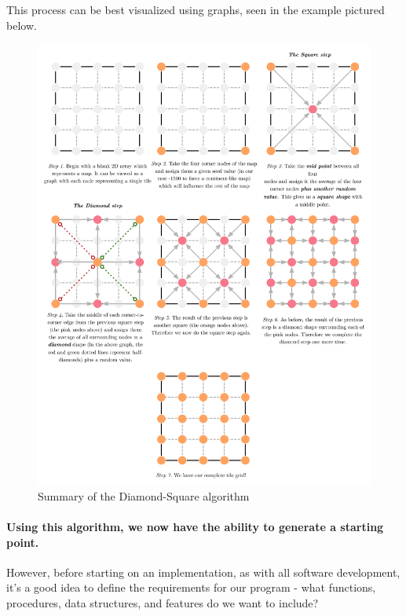 \documentclass{article}
\begin{document}
This process can be best visualized using graphs, seen in the example pictured below.
	
\begin{figure}[H]
	\centering
	\includegraphics[width=\linewidth]{diamondsquare.jpg}
	\renewcommand{\figurename}{Example}
	\caption{Summary of the Diamond-Square algorithm}
\end{figure}
	
\paragraph{Using this algorithm, we now have the ability to generate a starting point.}
However, before starting on an implementation, as with all software development, it's a good idea to define the requirements for our program - what functions, procedures, data structures, and features do we want to include?
	
\end{document}
